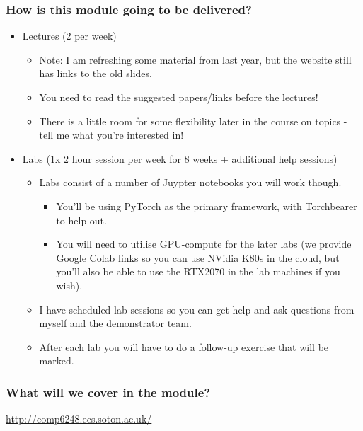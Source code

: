 \documentclass[\beamerclass]{beamer}
\begin{document}
\begin{frame}
	\frametitle{How is this module going to be delivered?}
	
	\begin{itemize}
		\item<+-> Lectures (2 per week)
		\begin{itemize}
			\item Note: I am refreshing some material from last year, but the website still has links to the old slides.
			\item You need to read the suggested papers/links before the lectures!
			\item There is a little room for some flexibility later in the course on topics - tell me what you're interested in!
		\end{itemize}
		\item<+-> Labs (1x 2 hour session per week for 8 weeks + additional help sessions)
		\begin{itemize}
			\item Labs consist of a number of Juypter notebooks you will work though.
			\begin{itemize}
				\item You'll be using PyTorch as the primary framework, with Torchbearer to help out.
				\item You will need to utilise GPU-compute for the later labs (we provide Google Colab links so you can use NVidia K80s in the cloud, but you'll also be able to use the RTX2070 in the lab machines if you wish).
			\end{itemize}
			\item I have scheduled lab sessions so you can get help and ask questions from myself and the demonstrator team.
			\item After each lab you will have to do a follow-up exercise that will be marked.
		\end{itemize}
	\end{itemize}
\end{frame}

\begin{frame}
	\frametitle{What will we cover in the module?}
	\url{http://comp6248.ecs.soton.ac.uk/}
\end{frame}
\end{document}
